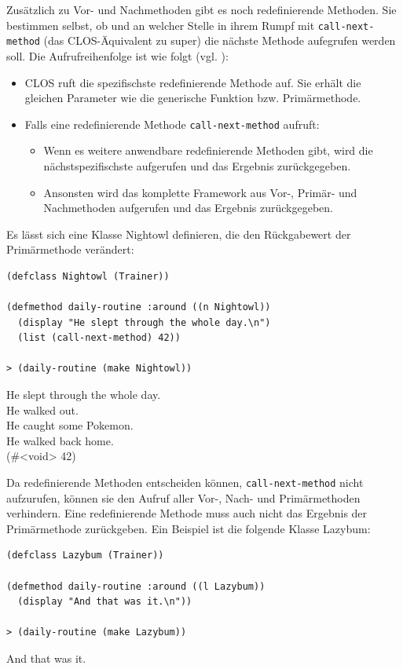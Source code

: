 Zusätzlich zu Vor- und Nachmethoden gibt es noch redefinierende Methoden. Sie bestimmen selbst, ob und an welcher Stelle in ihrem Rumpf mit \texttt{call-next-method} (das CLOS-Äquivalent zu super) die nächste Methode aufegrufen werden soll. Die Aufrufreihenfolge ist wie folgt (vgl. \cite[S.103]{keene}):
\begin{itemize}
 \item CLOS ruft die spezifischste redefinierende Methode auf. Sie erhält die gleichen Parameter wie die generische Funktion bzw. Primärmethode.
 \item Falls eine redefinierende Methode \texttt{call-next-method} aufruft:
 \begin{itemize}
  \item Wenn es weitere anwendbare redefinierende Methoden gibt, wird die nächstspezifischste aufgerufen und das Ergebnis zurückgegeben.
  \item Ansonsten wird das komplette Framework aus Vor-, Primär- und Nachmethoden aufgerufen und das Ergebnis zurückgegeben.
 \end{itemize}
\end{itemize}

Es lässt sich eine Klasse Nightowl definieren, die den Rückgabewert der Primärmethode verändert:

\begin{lstlisting}
(defclass Nightowl (Trainer))

(defmethod daily-routine :around ((n Nightowl))
  (display "He slept through the whole day.\n")
  (list (call-next-method) 42))
  
> (daily-routine (make Nightowl))
\end{lstlisting}
{\routput He slept through the whole day.\\
\phantom{.}He walked out.\\
\phantom{.}He caught some Pokemon.\\
\phantom{.}He walked back home.\\
\phantom{.}(\#<void> 42)}

Da redefinierende Methoden entscheiden können, \texttt{call-next-method} nicht aufzurufen, können sie den Aufruf aller Vor-, Nach- und Primärmethoden verhindern. Eine redefinierende Methode muss auch nicht das Ergebnis der Primärmethode zurückgeben. Ein Beispiel ist die folgende Klasse Lazybum:

\begin{lstlisting}
(defclass Lazybum (Trainer))

(defmethod daily-routine :around ((l Lazybum))
  (display "And that was it.\n"))
  
> (daily-routine (make Lazybum))
\end{lstlisting}
{\routput And that was it.}

